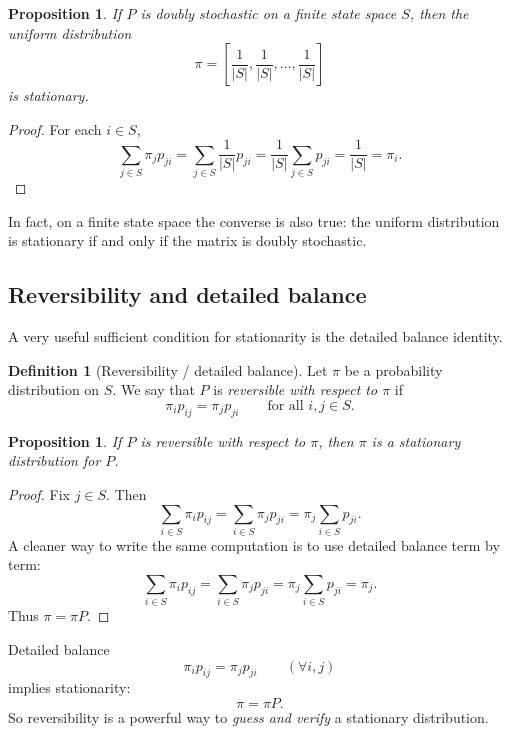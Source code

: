 \documentclass[11pt]{article}
\newtheorem{proposition}[theorem]{Proposition}
\theoremstyle{definition}
\newtheorem{definition}[theorem]{Definition}
\begin{document}
\begin{proposition}
If \(P\) is doubly stochastic on a finite state space \(S\), then the uniform distribution
\[
\pi=
\left[\frac1{|S|},\frac1{|S|},\dots,\frac1{|S|}\right]
\]
is stationary.
\end{proposition}

\begin{proof}
For each \(i\in S\),
\[
\sum_{j\in S}\pi_j p_{ji}
=
\sum_{j\in S}\frac1{|S|}p_{ji}
=
\frac1{|S|}\sum_{j\in S}p_{ji}
=
\frac1{|S|}
=
\pi_i.
\]
\end{proof}

In fact, on a finite state space the converse is also true: the uniform distribution is stationary if and only if the matrix is doubly stochastic.

\subsection{Reversibility and detailed balance}

A very useful sufficient condition for stationarity is the detailed balance identity.

\begin{definition}[Reversibility / detailed balance]
Let \(\pi\) be a probability distribution on \(S\). We say that \(P\) is \emph{reversible with respect to \(\pi\)} if
\[
\pi_i p_{ij}=\pi_j p_{ji}
\qquad \text{for all } i,j\in S.
\]
\end{definition}

\begin{proposition}
If \(P\) is reversible with respect to \(\pi\), then \(\pi\) is a stationary distribution for \(P\).
\end{proposition}

\begin{proof}
Fix \(j\in S\). Then
\[
\sum_{i\in S}\pi_i p_{ij}
=
\sum_{i\in S}\pi_j p_{ji}
=
\pi_j \sum_{i\in S}p_{ji}.
\]
A cleaner way to write the same computation is to use detailed balance term by term:
\[
\sum_{i\in S}\pi_i p_{ij}
=
\sum_{i\in S}\pi_j p_{ji}
=
\pi_j \sum_{i\in S} p_{ji}
=
\pi_j.
\]
Thus \(\pi=\pi P\).
\end{proof}

\begin{keyformula}
Detailed balance
\[
\pi_i p_{ij}=\pi_j p_{ji}
\qquad (\forall i,j)
\]
implies stationarity:
\[
\pi=\pi P.
\]
So reversibility is a powerful way to \emph{guess and verify} a stationary distribution.
\end{keyformula}
\end{document}
